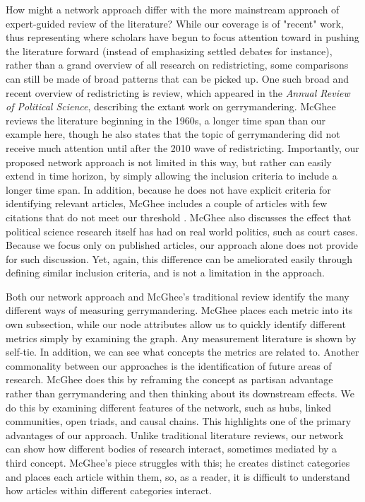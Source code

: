 \documentclass{cup-pan}
\begin{document}
How might a network approach differ with the more mainstream approach of expert-guided review of the literature? While our coverage is of "recent" work, thus representing where scholars have begun to focus attention toward in pushing the literature forward (instead of  emphasizing settled debates for instance), rather than a grand overview of all research on redistricting, some comparisons can still be made of broad patterns that can be picked up. One such broad and recent overview of redistricting is \citet{mcghee_partisan_2020} review, which appeared in the \emph{Annual Review of Political Science}, describing the extant work on gerrymandering. McGhee reviews the literature beginning in the 1960s, a longer time span than our example here, though he also states that the topic of gerrymandering did not receive much attention until after the 2010 wave of redistricting. Importantly, our proposed network approach is not limited in this way, but rather can easily extend in time horizon, by simply allowing the inclusion criteria to include a longer time span. In addition, because he does not have explicit criteria for identifying relevant articles, McGhee includes a couple of articles with few citations that do not meet our threshold \citep[such as in ][]{warrington_quantifying_2018}. McGhee also discusses the effect that political science research itself has had on real world politics, such as court cases. Because we focus only on published articles, our approach alone does not provide for such discussion. Yet, again, this difference can be ameliorated easily through defining similar inclusion criteria, and is not a limitation in the approach.\par 



Both our network approach and McGhee's traditional review identify the many different ways of measuring gerrymandering. McGhee places each metric into its own subsection, while our node attributes allow us to quickly identify different metrics simply by examining the graph. Any measurement literature is shown by self-tie. In addition, we can see what concepts the metrics are related to. Another commonality between our approaches is the identification of future areas of research. McGhee does this by reframing the concept as partisan advantage rather than gerrymandering and then thinking about its downstream effects. We do this by examining different features of the network, such as hubs, linked communities, open triads, and causal chains. This highlights one of the primary advantages of our approach. Unlike traditional literature reviews, our network can show how different bodies of research interact, sometimes mediated by a third concept. McGhee's piece struggles with this; he creates distinct categories and places each article within them, so, as a reader, it is difficult to understand how articles within different categories interact. 
\end{document}
